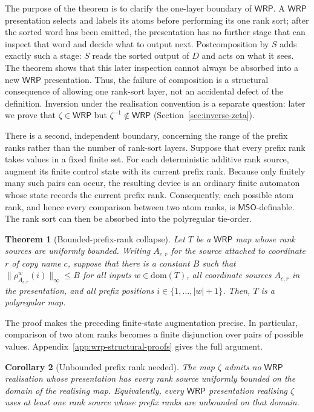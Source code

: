\documentclass[11pt]{article}
\newtheorem{theorem}{Theorem}[section]
\newtheorem{corollary}[theorem]{Corollary}
\theoremstyle{definition}
\newcommand{\WRP}{\mathsf{WRP}}
\newcommand{\MSO}{\mathsf{MSO}}
\begin{document}
The purpose of the theorem is to clarify the one-layer boundary of $\WRP$.
A $\WRP$ presentation selects and labels its atoms before performing its one
rank sort; after the sorted word has been emitted, the presentation has no
further stage that can inspect that word and decide what to output next.
Postcomposition by $S$ adds exactly such a stage: $S$ reads the sorted output
of $D$ and acts on what it sees.  The theorem shows that this later inspection
cannot always be absorbed into a new $\WRP$ presentation.  Thus, the failure of
composition is a structural consequence of allowing one rank-sort layer, not
an accidental defect of the definition.  Inversion under the realisation
convention is a separate question: later we prove that $\zeta\in\WRP$ but
$\zeta^{-1}\notin\WRP$ (Section~\ref{sec:inverse-zeta}).

There is a second, independent boundary, concerning the range of the prefix ranks
rather than the number of rank-sort layers.  Suppose that every prefix rank
takes values in a fixed finite set.  For each deterministic additive rank
source, augment its finite control state with its current prefix rank.
Because only finitely many such pairs can occur, the resulting device is an
ordinary finite automaton whose state records the current prefix rank.
Consequently, each possible atom rank, and hence every comparison between two
atom ranks, is
$\MSO$-definable.  The rank sort can then be absorbed into the polyregular
tie-order.

\begin{theorem}[Bounded-prefix-rank collapse]
\label{thm:bounded-rank-collapse}
Let $T$ be a $\WRP$ map whose rank sources are uniformly
\emph{bounded}.  Writing $A_{c,r}$ for the source attached to coordinate $r$
of copy name $c$, suppose that there is a constant $B$ such that
$\lVert\rho_{A_{c,r}}^w(i)\rVert_\infty\le B$ for all inputs
$w\in\mathrm{dom}(T)$, all coordinate sources $A_{c,r}$ in the presentation,
and all prefix positions
$i\in\{1,\ldots,|w|+1\}$.  Then, $T$ is a
polyregular map.
\end{theorem}

The proof makes the preceding finite-state augmentation precise.  In
particular, comparison of two atom ranks becomes a finite disjunction over
pairs of possible values.  Appendix~\ref{app:wrp-structural-proofs} gives the full
argument.

\begin{corollary}[Unbounded prefix rank needed]\label{cor:rank-necessary}
The map $\zeta$ admits no $\WRP$ realisation whose presentation has every rank
source uniformly bounded on the domain of the realising map.  Equivalently,
every $\WRP$ presentation realising $\zeta$ uses at least one rank source whose
prefix ranks are unbounded on that domain.
\end{corollary}
\end{document}
